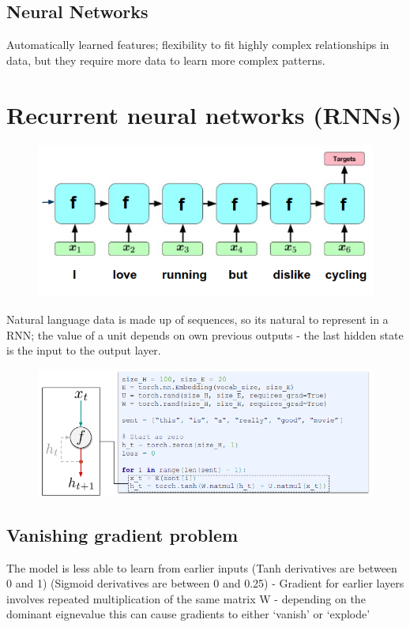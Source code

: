\documentclass[11pt]{article}
\begin{document}
\subsection{Neural Networks}

Automatically learned features; flexibility to fit highly complex relationships in data, but they require more data to learn more complex patterns.

\section{Recurrent neural networks (RNNs)}

\begin{figure}[H]
    \centering
    \includegraphics[width=.6\linewidth]{figures/RNN.png}    
\end{figure}

Natural language data is made up of sequences, so its natural to represent in a RNN; the value of a unit depends on own previous outputs - the last hidden state is the input to the output layer.

\begin{figure}[H]
    \centering
    \includegraphics[width=.6\linewidth]{figures/VanillaRNN.png}    
\end{figure}

\subsection{Vanishing gradient problem}

The model is less able to learn from earlier inputs (Tanh derivatives are between 0 and 1) (Sigmoid derivatives are between 0 and 0.25) - Gradient for earlier layers involves repeated multiplication
of the same matrix W - depending on the dominant eignevalue this can cause gradients to either `vanish' or `explode'
\end{document}
